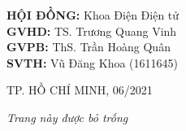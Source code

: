 \documentclass[12pt, a4paper, oneside]{book}
\newcommand{\csCouncil}{Khoa Điện Điện tử}
\newcommand{\csSupervise}{TS. Trương Quang Vinh}
\newcommand{\csReviewer}{ThS. Trần Hoàng Quân}
\newcommand{\csCompileTime}{06/2021}
\newcommand{\csSVone}{Vũ Đăng Khoa}
\newcommand{\csidSVone}{1611645}
\begin{document}
\begin{titlepage}
\begin{flushright}
    \begin{minipage}{0.6\textwidth}
        \large
        \textbf{HỘI ĐỒNG:} \csCouncil\\[0.1cm]
        \textbf{GVHD:} \csSupervise\\[0.1cm]
        \textbf{GVPB:} \csReviewer\\[0.5cm]
        \textbf{SVTH:} \csSVone{} (\csidSVone)
    \end{minipage}
\end{flushright}


\begin{center}
\vfill
{\fontsize{14}{1}\selectfont TP. HỒ CHÍ MINH, \csCompileTime}
\end{center}

\end{titlepage}
\restoregeometry

\thispagestyle{empty}
\clearpage
\begin{center}
\vspace*{3cm}
\large\emph{Trang này được bỏ trống}
\vspace*{\fill}
\end{center}
\addtocounter{page}{-1}
\end{document}

